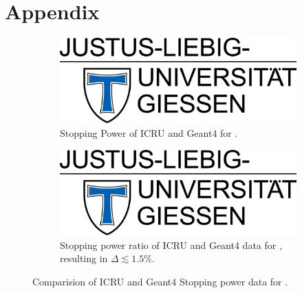 \documentclass{article}
\begin{document}
\section{Appendix}
\begin{figure}[htbp]
    \centering
    \begin{subfigure}[t]{0.49\textwidth}
        \centering
        \includegraphics[width=\textwidth]{fig/jlu.png}
        \caption{Stopping Power of ICRU and Geant4 for .}
        \label{fig:stoppcompare:1}
    \end{subfigure}
    \hfill
    \begin{subfigure}[t]{0.49\textwidth}
        \centering
        \includegraphics[width=\textwidth]{fig/jlu.png}
        \caption{Stopping power ratio of ICRU and Geant4 data for , resulting in $\Delta\lesssim1.5\%$.}
        \label{fig:stoppcompare:2}
    \end{subfigure}
    \caption{Comparision of ICRU and Geant4 Stopping power data for .}
    \label{fig:stoppcompare}
\end{figure}
\end{document}
